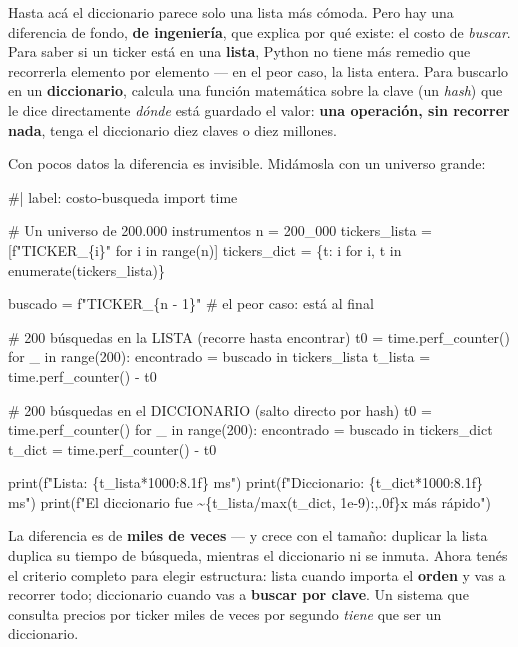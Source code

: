 \documentclass[
  spanish,
  letterpaper,
  DIV=11,
  numbers=noendperiod]{scrreprt}
\newenvironment{Shaded}{\begin{snugshade}}{\end{snugshade}}
\newcommand{\NormalTok}[1]{\textcolor[rgb]{0.00,0.23,0.31}{#1}}
\begin{document}
Hasta acá el diccionario parece solo una lista más cómoda. Pero hay una
diferencia de fondo, \textbf{de ingeniería}, que explica por qué existe:
el costo de \emph{buscar}. Para saber si un ticker está en una
\textbf{lista}, Python no tiene más remedio que recorrerla elemento por
elemento --- en el peor caso, la lista entera. Para buscarlo en un
\textbf{diccionario}, calcula una función matemática sobre la clave (un
\emph{hash}) que le dice directamente \emph{dónde} está guardado el
valor: \textbf{una operación, sin recorrer nada}, tenga el diccionario
diez claves o diez millones.

Con pocos datos la diferencia es invisible. Midámosla con un universo
grande:

\begin{Shaded}
\begin{Highlighting}[]
\NormalTok{\#| label: costo{-}busqueda}
\NormalTok{import time}

\NormalTok{\# Un universo de 200.000 instrumentos}
\NormalTok{n = 200\_000}
\NormalTok{tickers\_lista = [f"TICKER\_\{i\}" for i in range(n)]}
\NormalTok{tickers\_dict = \{t: i for i, t in enumerate(tickers\_lista)\}}

\NormalTok{buscado = f"TICKER\_\{n {-} 1\}"   \# el peor caso: está al final}

\NormalTok{\# 200 búsquedas en la LISTA (recorre hasta encontrar)}
\NormalTok{t0 = time.perf\_counter()}
\NormalTok{for \_ in range(200):}
\NormalTok{    encontrado = buscado in tickers\_lista}
\NormalTok{t\_lista = time.perf\_counter() {-} t0}

\NormalTok{\# 200 búsquedas en el DICCIONARIO (salto directo por hash)}
\NormalTok{t0 = time.perf\_counter()}
\NormalTok{for \_ in range(200):}
\NormalTok{    encontrado = buscado in tickers\_dict}
\NormalTok{t\_dict = time.perf\_counter() {-} t0}

\NormalTok{print(f"Lista:       \{t\_lista*1000:8.1f\} ms")}
\NormalTok{print(f"Diccionario: \{t\_dict*1000:8.1f\} ms")}
\NormalTok{print(f"El diccionario fue \textasciitilde{}\{t\_lista/max(t\_dict, 1e{-}9):,.0f\}x más rápido")}
\end{Highlighting}
\end{Shaded}

La diferencia es de \textbf{miles de veces} --- y crece con el tamaño:
duplicar la lista duplica su tiempo de búsqueda, mientras el diccionario
ni se inmuta. Ahora tenés el criterio completo para elegir estructura:
lista cuando importa el \textbf{orden} y vas a recorrer todo;
diccionario cuando vas a \textbf{buscar por clave}. Un sistema que
consulta precios por ticker miles de veces por segundo \emph{tiene} que
ser un diccionario.
\end{document}

